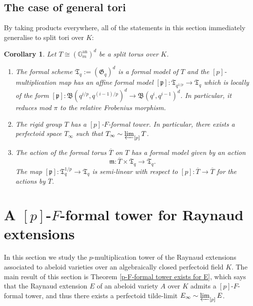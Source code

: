 \documentclass[10pt,oneside]{amsart}
\newtheorem{corollary}[theorem]{Corollary}
\theoremstyle{definition}
\begin{document}
	\subsection{The case of general tori}
	By taking products everywhere, all of the statements in this section immediately generalise to split tori over $K$: 
	\begin{corollary}\label{torus has formal models}\label{torus has p-F-formal tower and has perfectoid tilde-limit}\label{action on formal model of torus, case of general tori}
		Let $T\cong(\mathbb G_m^{\operatorname{an}})^d$ be a split torus over $K$.
		\begin{enumerate}
		\item The formal scheme $\mathfrak T_q := (\mathfrak G_q)^d$ is a formal model of $T$ and the $[p]$-multiplication map has an affine formal model $[\mathfrak p]:\mathfrak T_{q^{1/p}}\rightarrow \mathfrak T_{q}$ which is locally of the form $[\mathfrak p]: \mathfrak B(q^{i/p},q^{(i-1)/p})^d\rightarrow \mathfrak B(q^{i},q^{i-1})^d$. In particular, it reduces mod $\pi$ to the relative Frobenius morphism.
	\item	The rigid group $T$ has a $[p]$-$F$-formal tower. In particular, there exists a perfectoid space $T_\infty$ such that $T_\infty \sim \varprojlim_{[p]} T$. 
	\item 	The action of the formal torus $\overline{T}$ on $T$ has a formal model given by an action
		\[\mathfrak m:\overline{T}\times \mathfrak T_q\rightarrow \mathfrak T_q.\]
		The map $[\mathfrak p]:\mathfrak T_q^{1/p}\rightarrow \mathfrak T_q$ is semi-linear with respect to $[p]:\overline{T}\rightarrow \overline{T}$ for the actions by $\overline{T}$.
	\end{enumerate}
	\end{corollary}  
	
	

	\section{A $[p]$-$F$-formal tower for Raynaud extensions}\label{Raynaud extensions as principal bundles of formal and rigid spaces}
	In this section we study the $p$-multiplication tower of the Raynaud extensions associated to abeloid varieties over an algebraically closed perfectoid field $K$. The main result of this section is Theorem \ref{p-F-formal tower exists for E}, which says that the Raynaud extension $E$ of an abeloid variety $A$ over $K$ admits a $[p]$-$F$-formal tower, and thus there exists a perfectoid tilde-limit $E_\infty \sim \varprojlim_{[p]} E$.  
	
\end{document}
